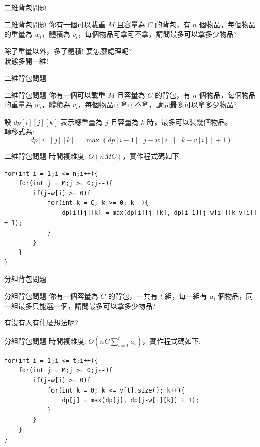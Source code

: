 \documentclass[aspectratio=169]{beamer}
\begin{document}
\begin{frame}[fragile]{二維背包問題}
    \begin{block}{二維背包問題}
        你有一個可以載重 $M$ 且容量為 $C$ 的背包，有 $n$ 個物品，每個物品的重量為 $w_i$，體積為 $v_i$，每個物品可拿可不拿，請問最多可以拿多少物品?
    \end{block} 
    除了重量以外，多了體積! 要怎麼處理呢? \\ \pause
    狀態多開一維!
\end{frame} 

\begin{frame}[fragile]{二維背包問題}
    \begin{block}{二維背包問題}
        你有一個可以載重 $M$ 且容量為 $C$ 的背包，有 $n$ 個物品，每個物品的重量為 $w_i$，體積為 $v_i$，每個物品可拿可不拿，請問最多可以拿多少物品?
    \end{block} 
    設 $dp[i][j][k]$ 表示總重量為 $j$ 且容量為 $k$ 時，最多可以裝幾個物品。 \\
    \vspace{5mm}
    轉移式為:
        $$dp[i][j][k] = \max(dp[i-1][j-w[i]][k-v[i]]+1)$$
\end{frame} 

\begin{frame}[fragile]{二維背包問題}
    時間複雜度: $O(nMC)$，實作程式碼如下: 
    \begin{lstlisting}
for(int i = 1;i <= n;i++){
    for(int j = M;j >= 0;j--){
        if(j-w[i] >= 0){
            for(int k = C; k >= 0; k--){
                dp[i][j][k] = max(dp[i][j][k], dp[i-1][j-w[i]][k-v[i]] + 1);
            }
        }
    }
}
    \end{lstlisting}
\end{frame} 

\begin{frame}[fragile]{分組背包問題}
    \begin{block}{分組背包問題}
        你有一個容量為 $C$ 的背包，一共有 $t$ 組，每一組有 $a_i$ 個物品，同一組最多只能選一個，請問最多可以拿多少物品?
    \end{block} 
    有沒有人有什麼想法呢?
\end{frame} 

\begin{frame}[fragile]{分組背包問題}
    時間複雜度: $O(nC \sum_{i=1}^t a_i)$，實作程式碼如下: 
    \begin{lstlisting}
for(int i = 1;i <= t;i++){
    for(int j = M;j >= 0;j--){
        if(j-w[i] >= 0){
            for(int k = 0; k <= v[t].size(); k++){
                dp[j] = max(dp[j], dp[j-w[i][k]] + 1);
            }
        }
    }
}
    \end{lstlisting}
\end{frame} 
\end{document}
